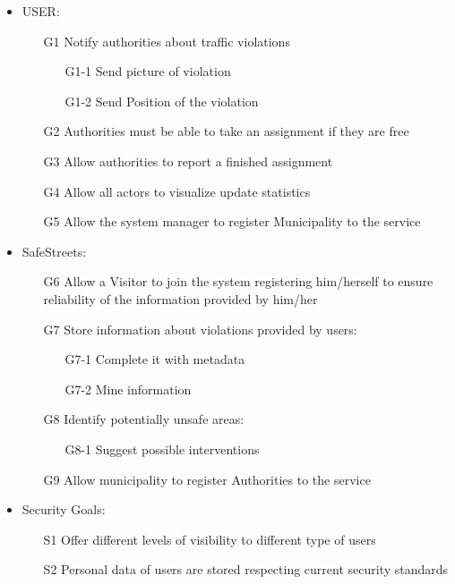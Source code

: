 \begin{itemize}
\item	USER:
\begin{itemize}
\item[G1] Notify authorities about traffic violations
\begin{itemize}
\item[G1-1] Send picture of violation
\item[G1-2] Send Position of the violation
\end{itemize}
\item[G2] Authorities must be able to take an assignment if they are free
\item[G3] Allow authorities to report a finished assignment
\item[G4]Allow all actors to visualize update statistics
\item[G5] Allow the system manager to register Municipality to the service
\end{itemize}
\item	SafeStreets:
\begin{itemize}
\item[G6] Allow a Visitor to join the system registering him/herself to ensure reliability of the information provided by him/her
\item[G7] Store information about violations provided by users:
\begin{itemize}
\item[G7-1] Complete it with metadata
\item[G7-2] Mine information
\end{itemize}
\item[G8] Identify potentially unsafe areas:
\begin{itemize}
\item[G8-1] Suggest possible interventions
\end{itemize}
\item[G9] Allow municipality to register Authorities to the service
\end{itemize}
\item	Security Goals:
\begin{itemize}
\item[S1] Offer different levels of visibility to different type of users
\item[S2] Personal data of users are stored respecting current security standards
\end{itemize}
\end{itemize}
